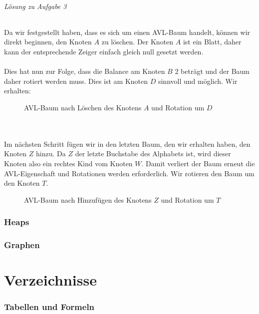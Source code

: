 \documentclass[11pt,a4paper]{scrartcl}
\begin{document}
\paragraph{Lösung zu Aufgabe 3}
\label{a4.3:lsg}
Da wir festgestellt haben, dass es sich um einen AVL-Baum handelt, können wir direkt beginnen, den Knoten $A$ zu löschen. Der Knoten $A$ ist ein Blatt, daher kann der entsprechende Zeiger einfach gleich null gesetzt werden. \\\\
Dies hat nun zur Folge, dass die Balance am Knoten $B$ 2 beträgt und der Baum daher rotiert werden muss. Dies ist am Knoten $D$ sinnvoll und möglich. Wir erhalten:
\begin{figure}[h]
\centering
{}
\caption{AVL-Baum nach Löschen des Knotens $A$ und Rotation um $D$}
\end{figure}
\\\\
Im nächsten Schritt fügen wir in den letzten Baum, den wir erhalten haben, den Knoten $Z$ hinzu. Da $Z$ der letzte Buchstabe des Alphabets ist, wird dieser Knoten also ein rechtes Kind vom Knoten $W$. Damit verliert der Baum erneut die AVL-Eigenschaft und Rotationen werden erforderlich. Wir rotieren den Baum um den Knoten $T$.
\begin{figure}[h]
\centering
{}
\caption{AVL-Baum nach Hinzufügen des Knotens $Z$ und Rotation um $T$}
\end{figure}
\label{a4.4:lsg}
\section{Heaps}
\label{a5.1:lsg}
\label{a5.2:lsg}
\label{a5.3:lsg}
\label{a5.4:lsg}
\section{Graphen}
\label{a6.1:lsg}
\label{a6.2:lsg}
\label{a6.3:lsg}
\label{a6.4:lsg}
\pagebreak
\part{Verzeichnisse}
\section*{Tabellen und Formeln}
\listoffigures
\printbibliography
\end{document}
